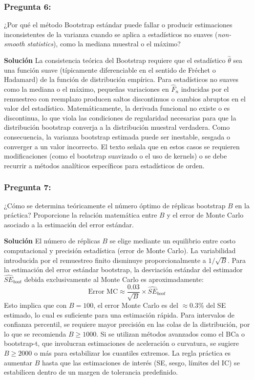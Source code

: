 \documentclass[a4paper]{article}
\begin{document}
\subsubsection{Pregunta 6:} ¿Por qué el método Bootstrap estándar puede fallar o producir estimaciones inconsistentes de la varianza cuando se aplica a estadísticos no suaves (\textit{non-smooth statistics}), como la mediana muestral o el máximo?

\textbf{Solución}
La consistencia teórica del Bootstrap requiere que el estadístico $\hat{\theta}$ sea una función suave (típicamente diferenciable en el sentido de Fréchet o Hadamard) de la función de distribución empírica. Para estadísticos no suaves como la mediana o el máximo, pequeñas variaciones en $\hat{F}_n$ inducidas por el remuestreo con reemplazo producen saltos discontinuos o cambios abruptos en el valor del estadístico. Matemáticamente, la derivada funcional no existe o es discontinua, lo que viola las condiciones de regularidad necesarias para que la distribución bootstrap converja a la distribución muestral verdadera. Como consecuencia, la varianza bootstrap estimada puede ser inestable, sesgada o converger a un valor incorrecto. El texto señala que en estos casos se requieren modificaciones (como el bootstrap suavizado o el uso de kernels) o se debe recurrir a métodos analíticos específicos para estadísticos de orden.

\subsubsection{Pregunta 7:} ¿Cómo se determina teóricamente el número óptimo de réplicas bootstrap $B$ en la práctica? Proporcione la relación matemática entre $B$ y el error de Monte Carlo asociado a la estimación del error estándar.

\textbf{Solución}
El número de réplicas $B$ se elige mediante un equilibrio entre costo computacional y precisión estadística (error de Monte Carlo). La variabilidad introducida por el remuestreo finito disminuye proporcionalmente a $1/\sqrt{B}$. Para la estimación del error estándar bootstrap, la desviación estándar del estimador $\widehat{SE}_{boot}$ debida exclusivamente al Monte Carlo es aproximadamente:
$$ \text{Error MC} \approx \frac{0.03}{\sqrt{B}} \times \widehat{SE}_{boot} $$
Esto implica que con $B=100$, el error Monte Carlo es del $\approx 0.3\%$ del SE estimado, lo cual es suficiente para una estimación rápida. Para intervalos de confianza percentil, se requiere mayor precisión en las colas de la distribución, por lo que se recomienda $B \geq 1000$. Si se utilizan métodos avanzados como el BCa o bootstrap-t, que involucran estimaciones de aceleración o curvatura, se sugiere $B \geq 2000$ o más para estabilizar los cuantiles extremos. La regla práctica es aumentar $B$ hasta que las estimaciones de interés (SE, sesgo, límites del IC) se estabilicen dentro de un margen de tolerancia predefinido.
\end{document}

